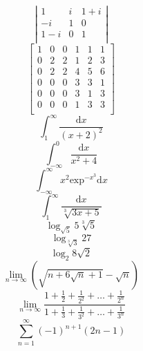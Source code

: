 \documentclass[12pt, a4paper]{article}
\begin{document}
\begin{equation}
\left|
\begin{array}{ccc}
1 & i & 1+i \\
-i & 1 & 0 \\
1-i & 0 & 1 \\
\end{array}
\right|
\end{equation}
\begin{equation}
\left[
\begin{array}{c|cc|ccc}
1 & 0 & 0 & 1 & 1 & 1 \\
\hline
0 & 2 & 2 & 1 & 2 & 3 \\
0 & 2 & 2 & 4 & 5 & 6 \\
\hline
0 & 0 & 0 & 3 & 3 & 1 \\
0 & 0 & 0 & 3 & 1 & 3 \\
0 & 0 & 0 & 1 & 3 & 3 \\
\end{array}
\right]
\end{equation}
\begin{equation}
\int_{1}^{\infty} \frac{\mathrm{d}x}{(x+2)^2}
\end{equation}
\begin{equation}
\int_{-\infty}^{0} \frac{\mathrm{d}x}{x^2 + 4}
\end{equation}
\begin{equation}
\int_{-\infty}^{\infty} x^2 \mathrm{exp}^{-x^{3}} \mathrm{d}x
\end{equation}
\begin{equation}
\int_{1}^{\infty} \frac{\mathrm{d}x}{\sqrt[3]{3x+5}}
\end{equation}
\begin{equation}
\log_{\sqrt{5}} 5 \sqrt[3]{5}
\end{equation}
\begin{equation}
\log_{\sqrt[3]{3}} 27
\end{equation}
\begin{equation}
\log_{2} 8 \sqrt{2}
\end{equation}
\begin{equation}
\lim_{n \rightarrow \infty} \left( \sqrt{n+6\sqrt{n}+1} - \sqrt{n} \right)
\end{equation}
\begin{equation}
\lim_{n \rightarrow \infty}
 \frac
 {1 + \frac{1}{2} + \frac{1}{2^2} + \hdots + \frac{1}{2^n}}
 {1 + \frac{1}{3} + \frac{1}{3^2} + \hdots + \frac{1}{3^n}}
\end{equation}
\begin{equation}
\sum^{\infty}_{n=1} (-1)^{n+1}(2n-1)
\end{equation}
\end{document}
